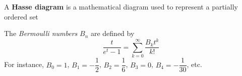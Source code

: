 \documentclass[main]{subfiles}
\begin{document}
\begin{definition}
A \textbf{Hasse diagram} is a mathematical diagram used to represent a partially ordered set
\begin{center}
\end{center}
\end{definition}

\begin{definition}
The \textit{Bermoulli numbers} $B_n$ are defined by
\[\frac{t}{e^t-1}=\sum_{k=0}^\infty\frac{B_kt^k}{k!}\]
For instance, $B_0=1$, $B_1=-\dfrac{1}{2}$, $B_2=\dfrac{1}{6}$, $B_3=0$, $B_4=-\dfrac{1}{30}$, etc.
\end{definition}
\end{document}
